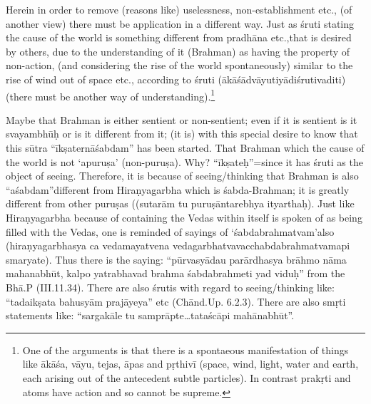 Herein in order to remove (reasons like) uselessness, non-establish\-ment etc., (of another view) there must be application in a different way. Just as śruti stating the cause of the world is something different from pradhāna etc.,that is desired by others, due to the understanding of it (Brahman) as having the property of non-action, (and considering the rise of the world spontaneously) similar to the rise of wind out of space etc., according to śruti (ākāśādvāyutiyādiśrutivaditi) (there must be another way of understanding).\footnote{One of the arguments is that there is a spontaeous manifestation of things like ākāśa, vāyu, tejas, āpas and pṛthivī (space, wind, light, water and earth, each arising out of the antecedent subtle particles). In contrast prakṛti and atoms have action and so cannot be supreme.} 

Maybe that Brahman is either sentient or non-sentient; even if it is sentient is it svayambhūḥ or is it different from it; (it is) with this special desire to know that this sūtra “īkṣaternāśabdam” has been started. That Brahman which the cause of the world is not ‘apuruṣa’ (non-puruṣa). Why? “īkṣateḥ”=since it has śruti as the object of seeing. Therefore, it is because of seeing/thinking  that Brahman is also “aśabdam”different from Hiraṇyagarbha which is śabda-Brahman; it is greatly different from other puruṣas ((sutarām tu puruṣāntarebhya ityarthaḥ). Just like Hiraṇyagarbha because of containing the Vedas within itself is spoken of as being filled with the Vedas, one is reminded of sayings of ‘śabdabrahmatvam’also (hiraṇyagarbhasya ca vedamayatvena vedagarbhatvavacchabdabrahmatvamapi smaryate). Thus there is the saying: “pūrvasyādau parārdhasya brāhmo nāma mahanabhūt, kalpo yatrabhavad brahma śabdabrahmeti yad viduḥ” from the Bhā.P (III.11.34). There are also śrutis with regard to seeing/thinking like: “tadaikṣata bahusyām prajāyeya” etc (Chānd.Up. 6.2.3). There are also smṛti statements like: “sargakāle tu samprāpte…tataścāpi mahānabhūt”. 

